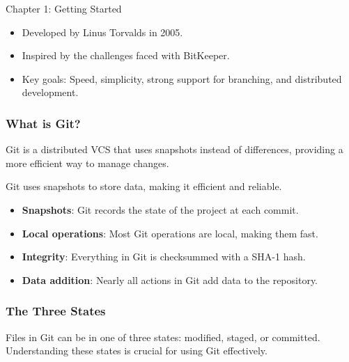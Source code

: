 \begin{notes}{Chapter 1: Getting Started}
\begin{highlight}
        \begin{itemize}
            \item Developed by Linus Torvalds in 2005.
            \item Inspired by the challenges faced with BitKeeper.
            \item Key goals: Speed, simplicity, strong support for branching, and distributed development.
        \end{itemize}
    
    \end{highlight}
    
    \subsubsection*{What is Git?}
    
    Git is a distributed VCS that uses snapshots instead of differences, providing a more efficient way to manage changes.
    
    \begin{highlight}
    
        Git uses snapshots to store data, making it efficient and reliable.
        
        \begin{itemize}
            \item \textbf{Snapshots}: Git records the state of the project at each commit.
            \item \textbf{Local operations}: Most Git operations are local, making them fast.
            \item \textbf{Integrity}: Everything in Git is checksummed with a SHA-1 hash.
            \item \textbf{Data addition}: Nearly all actions in Git add data to the repository.
        \end{itemize}
    
    \end{highlight}
    
    \subsubsection*{The Three States}
    
    Files in Git can be in one of three states: modified, staged, or committed. Understanding these states is crucial for using Git effectively.
    
    \begin{highlight}
    

\end{highlight}
\end{notes}
